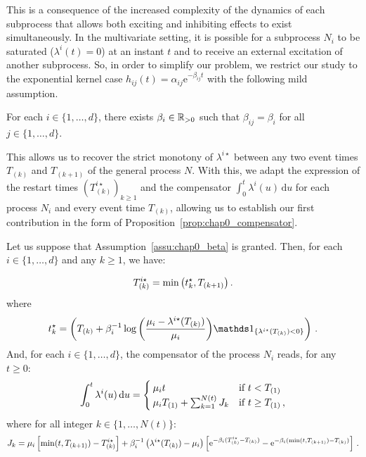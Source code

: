     This is a consequence of the increased complexity of the dynamics of each subprocess that allows both exciting and inhibiting effects to exist simultaneously.
    In the multivariate setting, it is possible for a subprocess $N_i$ to be saturated ($\lambda^i(t)=0$) at an instant $t$ and to receive an external excitation of another subprocess.
    So, in order to simplify our problem, we restrict our study to the exponential kernel case $h_{ij}(t) = \alpha_{ij}\mathrm{e}^{-\beta_{ij} t}$ with the following mild assumption.

    \begin{assumption}\label{assu:chap0_beta}
      For each $i\in\{1,\ldots, d\}$, there exists $\beta_i\in\RR_{>0}$ such that $\beta_{ij} = \beta_i$ for all $j\in\{1,\ldots, d\}$.
    \end{assumption}
    This allows us to recover the strict monotony of $\lambda^{i\star}$ between any two event times $T_{(k)}$ and $T_{(k+1)}$ of the general process $N$.
    With this, we adapt the expression of the restart times $(T_{(k)}^{i\star})_{k\geq 1}$ and the compensator $\int_{0}^{t}{\lambda^i(u)\,\mathrm{d}u}$ for each process $N_i$ and every event time $T_{(k)}$, allowing us to establish our first contribution in the form of Proposition~\ref{prop:chap0_compensator}.

    \begin{proposition}\label{prop:chap0_compensator}
      Let us suppose that Assumption~\ref{assu:chap0_beta} is granted. 
      Then, for each $i\in\{1,\ldots, d\}$ and any $k\geq1$, we have:
      
      \begin{equation}\label{eq:chap0_restart_times_exponential}
        T\park^{i\star} = \min{\adaptedpar{t^\star_k, T\park[k+1]}}\,.
      \end{equation}
      where
      \[t^\star_k = \adaptedpar{T\park + \beta_i^{-1}\log{\adaptedpar{\frac{\mu_i - \lambda^{i\star}(T\park)}{\mu_i}}}\II_{\{\lambda^{i\star}(T\park) < 0\}}}\,.\]
      And, for each $i\in\{1,\ldots, d\}$, the compensator of the process $N_i$ reads, for any $t\geq 0$:
      \begin{equation}\label{eq:chap0_compensator_exponential}
        \int_{0}^{t}{\lambda^i(u)\,\mathrm{d}u} =
        \begin{cases}
          \mu_i t & \text{if } t < T\park[1] \\
          \mu_i T\park[1] + \sum_{k=1}^{N(t)} J_k & \text{if } t \geq T\park[1] \,,
        \end{cases}
      \end{equation}
      where for all integer \(k \in \{1, \dots, N(t)\}\):
      \begin{equation*}
        J_k =
        \mu_i \left[\min(t, T\park[k+1] ) - T\park^{i\star}\right] + \beta_i^{-1} \left(\lambda^{i\star}(T\park) - \mu_i \right)
        \left[ \mathrm{e}^{-\beta_i(T\park^{i\star} - T\park)} - \mathrm{e}^{-\beta_i(\min(t, T\park[k+1])- T\park)} \right]\,.
      \end{equation*}
      \end{proposition}

